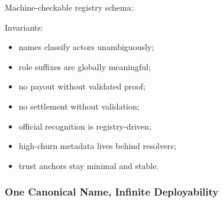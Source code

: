 Machine-checkable registry schema:

\begin{Shaded}
\begin{Highlighting}[]
\FunctionTok{\{}
  \FunctionTok{:} \FunctionTok{\{}
    \FunctionTok{:} \FunctionTok{,}
    \FunctionTok{:} \FunctionTok{,}
    \FunctionTok{:} \FunctionTok{\{}
      \FunctionTok{:} \FunctionTok{,}
      \FunctionTok{:} \FunctionTok{,}
      \FunctionTok{:} \FunctionTok{,}
      \FunctionTok{:} 
    \FunctionTok{\},}
    \FunctionTok{:} \OtherTok{[]}\FunctionTok{,}
    \FunctionTok{:} \FunctionTok{,}
    \FunctionTok{:} \FunctionTok{,}
    \FunctionTok{:} \FunctionTok{\{\},}
    \FunctionTok{:} 
  \FunctionTok{\}}
\FunctionTok{\}}
\end{Highlighting}
\end{Shaded}

Invariants:

\begin{itemize}
\tightlist
\item
  names classify actors unambiguously;
\item
  role suffixes are globally meaningful;
\item
  no payout without validated proof;
\item
  no settlement without validation;
\item
  official recognition is registry-driven;
\item
  high-churn metadata lives behind resolvers;
\item
  trust anchors stay minimal and stable.
\end{itemize}

\subsubsection{One Canonical Name, Infinite
Deployability}\label{one-canonical-name-infinite-deployability}

